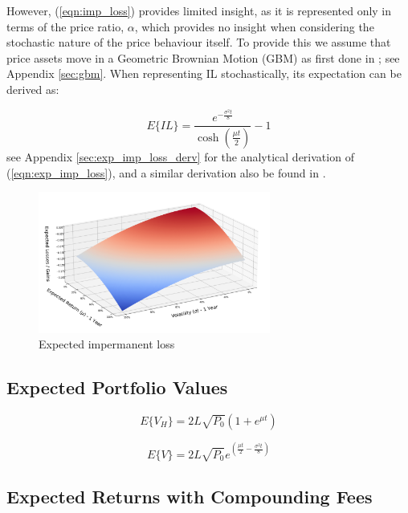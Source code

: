 \documentclass[journal,twocolumn,12pt]{ieeesyscoin}
\begin{document}
However, (\ref{eqn:imp_loss}) provides limited insight, as it is represented only in terms of the price ratio, $\alpha$, which provides no insight when considering the stochastic nature of the price behaviour itself. To provide this we assume that price assets move in a Geometric Brownian Motion (GBM) as first done in \cite{Gui21}; see Appendix \ref{sec:gbm}. When representing IL stochastically, its expectation can be derived as:

\begin{equation}\label{eqn:exp_imp_loss}
  E\{IL\} = \frac{e^{-\frac{\sigma^2 t}{8}}}{\cosh (\frac{\mu t}{2})} - 1
\end{equation}
see Appendix \ref{sec:exp_imp_loss_derv} for the analytical derivation of (\ref{eqn:exp_imp_loss}), and a similar derivation also be found in \cite{Dan22}.

\begin{figure}[h!]
\includegraphics[width=3in]{img/imp_loss.png}
\caption{Expected impermanent loss} 
\label{fig:daosys_protocol}
\end{figure}

\subsection{Expected Portfolio Values}
\label{sec:exp_portfolio_value}

\lipsum[1]

\begin{equation}\label{eqn:held_portfolio}
  E\{V_{H}\} = 2 L \sqrt{P_{0}} (1 + e^{\mu t})
\end{equation}

\begin{equation}\label{eqn:portfolio_outside}
  E\{V\} = 2 L \sqrt{P_{0}}  e^{(\frac{\mu t}{2} - \frac{\sigma^2 t}{8})}
\end{equation}

\subsection{Expected Returns with Compounding Fees}
\label{sec:exp_lp_returns}
\end{document}
